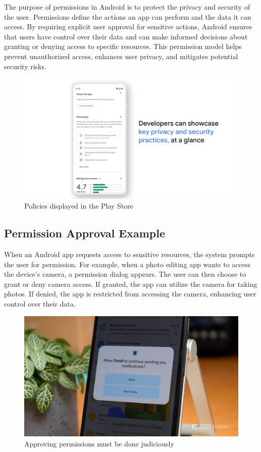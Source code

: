 \documentclass[11pt]{article}
\begin{document}
The purpose of permissions in Android is to protect the privacy and security of the user. Permissions define the actions an app can perform and the data it can access. By requiring explicit user approval for sensitive actions, Android ensures that users have control over their data and can make informed decisions about granting or denying access to specific resources. This permission model helps prevent unauthorized access, enhances user privacy, and mitigates potential security risks.


\begin{figure}[H]
    \centering
    \includegraphics[width=.75\textwidth]{app policies in android/app policies in android_4.jpg}
    \caption{Policies displayed in the Play Store}
\end{figure}

\subsection{Permission Approval Example}

When an Android app requests access to sensitive resources, the system prompts the user for permission. For example, when a photo editing app wants to access the device's camera, a permission dialog appears. The user can then choose to grant or deny camera access. If granted, the app can utilize the camera for taking photos. If denied, the app is restricted from accessing the camera, enhancing user control over their data.

\begin{figure}[H]
    \centering
    \includegraphics[width=.95\textwidth]{types of permissions in android/types of permissions in android_9.jpg}
    \caption{Approving permissions must be done judiciously}
\end{figure}
\end{document}
